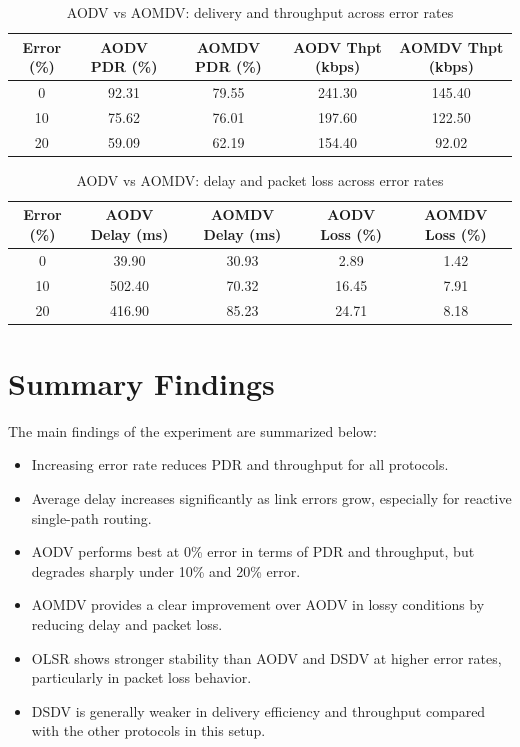 \documentclass[11pt]{article}
\begin{document}
\begin{table}[H]
    \centering
    \small
    \caption{AODV vs AOMDV: delivery and throughput across error rates}
    \begin{tabular}{ccccc}
        \toprule
        Error (\%) & AODV PDR (\%) & AOMDV PDR (\%) & AODV Thpt (kbps) & AOMDV Thpt (kbps) \\
        \midrule
        0 & 92.31 & 79.55 & 241.30 & 145.40 \\
        10 & 75.62 & 76.01 & 197.60 & 122.50 \\
        20 & 59.09 & 62.19 & 154.40 & 92.02 \\
        \bottomrule
    \end{tabular}
\end{table}

\begin{table}[H]
    \centering
    \small
    \caption{AODV vs AOMDV: delay and packet loss across error rates}
    \begin{tabular}{ccccc}
        \toprule
        Error (\%) & AODV Delay (ms) & AOMDV Delay (ms) & AODV Loss (\%) & AOMDV Loss (\%) \\
        \midrule
        0 & 39.90 & 30.93 & 2.89 & 1.42 \\
        10 & 502.40 & 70.32 & 16.45 & 7.91 \\
        20 & 416.90 & 85.23 & 24.71 & 8.18 \\
        \bottomrule
    \end{tabular}
\end{table}

\section{Summary Findings}

The main findings of the experiment are summarized below:

\begin{itemize}
    \item Increasing error rate reduces PDR and throughput for all protocols.
    \item Average delay increases significantly as link errors grow, especially for reactive single-path routing.
    \item AODV performs best at 0\% error in terms of PDR and throughput, but degrades sharply under 10\% and 20\% error.
    \item AOMDV provides a clear improvement over AODV in lossy conditions by reducing delay and packet loss.
    \item OLSR shows stronger stability than AODV and DSDV at higher error rates, particularly in packet loss behavior.
    \item DSDV is generally weaker in delivery efficiency and throughput compared with the other protocols in this setup.
\end{itemize}
\end{document}
